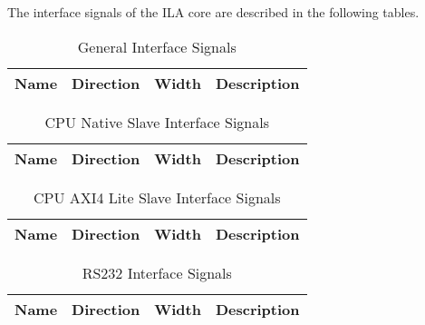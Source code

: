 \label{sec:is}

The interface signals of the ILA core are described in the following tables.

\begin{table}[H]
  \centering
  \begin{tabular}{|l|l|r|p{10.5cm}|}
    
    \hline
    \rowcolor{iob-green}
    {\bf Name} & {\bf Direction} & {\bf Width} & {\bf Description}  \\ \hline \hline

    
 
  \end{tabular}
  \caption{General Interface Signals}
  \label{gen_is_tab:is}
\end{table}

\begin{table}[H]
  \centering
  \begin{tabular}{|l|l|r|p{10.5cm}|}
    
    \hline
    \rowcolor{iob-green}
    {\bf Name} & {\bf Direction} & {\bf Width} & {\bf Description}  \\ \hline \hline

    
 
  \end{tabular}
  \caption{CPU Native Slave Interface Signals}
  \label{cpu_nat_s_is_tab:is}
\end{table}

\begin{table}[H]
  \centering
  \begin{tabular}{|l|l|r|p{9.5cm}|}
    
    \hline
    \rowcolor{iob-green}
    {\bf Name} & {\bf Direction} & {\bf Width} & {\bf Description}  \\ \hline \hline

    
 
  \end{tabular}
  \caption{CPU AXI4 Lite Slave Interface Signals}
  \label{cpu_axi4lite_s_is_tab:is}
\end{table}


\begin{table}[H]
  \centering
  \begin{tabular}{|l|l|r|p{9.5cm}|}
    
    \hline
    \rowcolor{iob-green}
    {\bf Name} & {\bf Direction} & {\bf Width} & {\bf Description}  \\ \hline \hline

    
 
  \end{tabular}
  \caption{RS232 Interface Signals}
  \label{cpu_axi4lite_s_is_tab:is}
\end{table}


